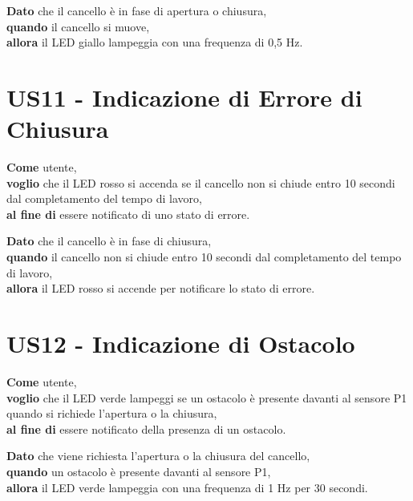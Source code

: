 \begin{tcolorbox}[title={Criterio di Accettazione}, colback=blue!20!white, colframe=blue!80!black]
    \textbf{Dato} che il cancello è in fase di apertura o chiusura, \\
    \textbf{quando} il cancello si muove, \\
    \textbf{allora} il LED giallo lampeggia con una frequenza di 0,5 Hz.
\end{tcolorbox}

\section{US11 - Indicazione di Errore di Chiusura}
    \begin{tcolorbox}[title={Descrizione}, colback=red!20!white, colframe=red!80!black]
    \textbf{Come} utente, \\
    \textbf{voglio} che il LED rosso si accenda se il cancello non si chiude entro 10 secondi dal completamento del tempo di lavoro, \\
    \textbf{al fine di} essere notificato di uno stato di errore.
\end{tcolorbox}

\begin{tcolorbox}[title={Criterio di Accettazione}, colback=blue!20!white, colframe=blue!80!black]
    \textbf{Dato} che il cancello è in fase di chiusura, \\
    \textbf{quando} il cancello non si chiude entro 10 secondi dal completamento del tempo di lavoro, \\
    \textbf{allora} il LED rosso si accende per notificare lo stato di errore.
\end{tcolorbox}

\section{US12 - Indicazione di Ostacolo}
\begin{tcolorbox}[title={Descrizione}, colback=red!20!white, colframe=red!80!black]
    \textbf{Come} utente, \\
    \textbf{voglio} che il LED verde lampeggi se un ostacolo è presente davanti al sensore P1 quando si richiede l'apertura o la chiusura, \\
    \textbf{al fine di} essere notificato della presenza di un ostacolo.
\end{tcolorbox}

\begin{tcolorbox}[title={Criterio di Accettazione}, colback=blue!20!white, colframe=blue!80!black]
    \textbf{Dato} che viene richiesta l'apertura o la chiusura del cancello, \\
    \textbf{quando} un ostacolo è presente davanti al sensore P1, \\
    \textbf{allora} il LED verde lampeggia con una frequenza di 1 Hz per 30 secondi.
\end{tcolorbox}

